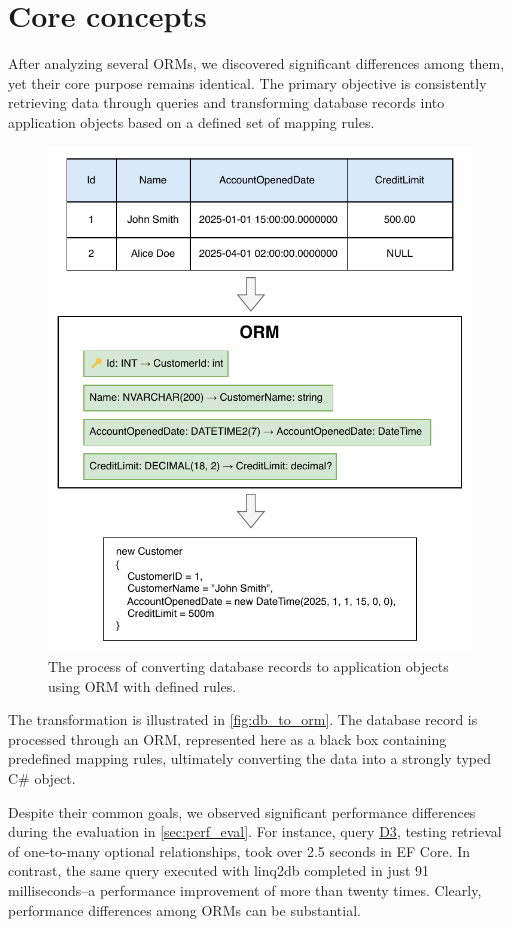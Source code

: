 \chapter{Core concepts}

After analyzing several ORMs, we discovered significant differences among them, yet their core purpose remains identical. The primary objective is consistently retrieving data through queries and transforming database records into application objects based on a defined set of mapping rules.

\begin{figure}[H]
  \centering
  \includegraphics[height=1\textwidth]{thesis/img/thesis/03_orm_transformation.drawio.pdf}
  \caption{The process of converting database records to application objects using ORM with defined rules.}
  \label{fig:db_to_orm}
\end{figure}

The transformation is illustrated in \autoref{fig:db_to_orm}. The database record is processed through an ORM, represented here as a black box containing predefined mapping rules, ultimately converting the data into a strongly typed C\# object.

Despite their common goals, we observed significant performance differences during the evaluation in \autoref{sec:perf_eval}. For instance, query \hyperref[query:d3]{D3}, testing retrieval of one-to-many optional relationships, took over 2.5 seconds in EF Core. In contrast, the same query executed with linq2db completed in just 91 milliseconds--a performance improvement of more than twenty times. Clearly, performance differences among ORMs can be substantial.

